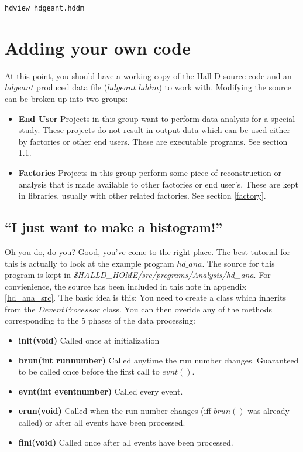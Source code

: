 \documentclass[12pt]{article}
\begin{document}
\begin{lstlisting}[frame=shadowbox,backgroundcolor=\color{cmdbkgd}]
hdview hdgeant.hddm
\end{lstlisting}


\section{Adding your own code}
At this point, you should have a working copy of the Hall-D source 
code and an $hdgeant$ produced data file ($hdgeant.hddm$) to work with.
Modifying the source can be broken up into two groups:
\begin{itemize}
	\item{\bf End User} Projects in this group want to perform
	data analysis for a special study. These projects do not result
	in output data which can be used either by factories or other
	end users. These are executable programs. See section \ref{enduser}.
	
	\item{\bf Factories} Projects in this group perform some piece
	of reconstruction or analysis that is made available to other
	factories or end user's. These are kept in libraries, usually with
	other related factories. See section \ref{factory}.
\end{itemize}

\subsection{``I just want to make a histogram!''}
\label{enduser}
Oh you do, do you? Good, you've come to the right place. The best
tutorial for this is actually to look at the example program $hd\_ana$. The
source for this program is kept in
{\it \$HALLD\_HOME/src/programs/Analysis/hd\_ana}. For convienience, the
source has been included in this note in appendix \ref{hd_ana_src}.
The basic idea is
this: You need to create a class which inherits from the $DeventProcessor$
class. You can then overide any of the methods corresponding to the 5 phases
of the data processing:

\begin{itemize}
	\item{\bf init(void)} Called once at initialization
	\item{\bf brun(int runnumber)} Called anytime the run number changes.
	 Guaranteed to be called once before the first call to $evnt()$.
	\item{\bf evnt(int eventnumber)} Called every event.
	\item{\bf erun(void)} Called when the run number changes (iff $brun()$
	 was already called) or after all events have been processed.
	\item{\bf fini(void)} Called once after all events have been processed.
\end{itemize}
\end{document}
